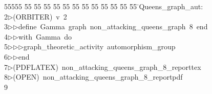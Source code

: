 %
%
\begin{tabbing}
55555 \= 55 \= 55 \= 55 \= 55 \= 55 \= 55 \= 55 \= 55 \= 55 \= 55 \= 55 \= 55 \= \>Queens\_graph\_aut:\\[0pt]
2\>$\triangleright$\>(ORBITER)\ v\ 2\ \\[0pt]
3\>$\triangleright$\>$\triangleright$\>define\ Gamma\ graph\ non\_attacking\_queens\_graph\ 8\ end\ \\[0pt]
4\>$\triangleright$\>$\triangleright$\>with\ Gamma\ do\ \\[0pt]
5\>$\triangleright$\>$\triangleright$\>$\triangleright$\>graph\_theoretic\_activity\ automorphism\_group\ \\[0pt]
6\>$\triangleright$\>$\triangleright$\>end\\[0pt]
7\>$\triangleright$\>(PDFLATEX)\ non\_attacking\_queens\_graph\_8\_reporttex\\[0pt]
8\>$\triangleright$\>(OPEN)\ non\_attacking\_queens\_graph\_8\_reportpdf\\[0pt]
9\>\end{tabbing}
